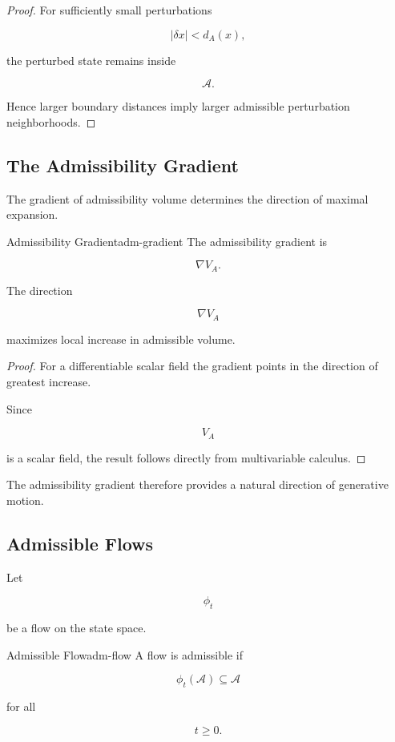 \documentclass[12pt,twoside,openright]{book}
\newenvironment{prop}
{\begin{proposition}{}{}}
{\end{proposition}}
\begin{document}
\begin{proof}
For sufficiently small perturbations

\[
|\delta x|
<
d_A(x),
\]

the perturbed state remains inside

\[
\mathcal A.
\]

Hence larger boundary distances imply larger admissible
perturbation neighborhoods.
\end{proof}

\subsection{The Admissibility Gradient}

The gradient of admissibility volume determines the
direction of maximal expansion.

\begin{definition}{Admissibility Gradient}{adm-gradient}
The admissibility gradient is

\[
\nabla V_A.
\]
\end{definition}

\begin{prop}
The direction

\[
\nabla V_A
\]

maximizes local increase in admissible volume.
\end{prop}

\begin{proof}
For a differentiable scalar field the gradient points in
the direction of greatest increase.

Since

\[
V_A
\]

is a scalar field, the result follows directly from
multivariable calculus.
\end{proof}

The admissibility gradient therefore provides a natural
direction of generative motion.

\subsection{Admissible Flows}

Let

\[
\phi_t
\]

be a flow on the state space.

\begin{definition}{Admissible Flow}{adm-flow}
A flow is admissible if

\[
\phi_t(\mathcal A)
\subseteq
\mathcal A
\]

for all

\[
t\ge0.
\]
\end{definition}
\end{document}
